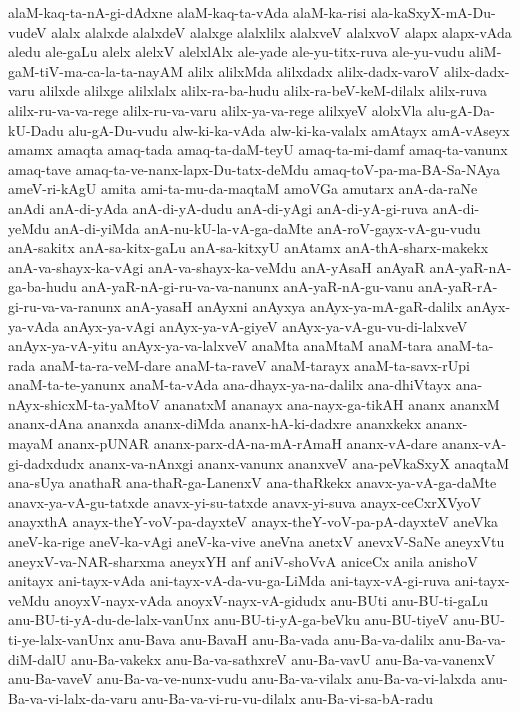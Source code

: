 {alaM-kaq-ta-nA-gi-dAdxne
alaM-kaq-ta-vAda
alaM-ka-risi
ala-kaSxyX-mA-Du-vudeV
alalx
alalxde
alalxdeV
alalxge
alalxlilx
alalxveV
alalxvoV
alapx
alapx-vAda
aledu
ale-gaLu
alelx
alelxV
alelxlAlx
ale-yade
ale-yu-titx-ruva
ale-yu-vudu
aliM-gaM-tiV-ma-ca-la-ta-nayAM
alilx
alilxMda
alilxdadx
alilx-dadx-varoV
alilx-dadx-varu
alilxde
alilxge
alilxlalx
alilx-ra-ba-hudu
alilx-ra-beV-keM-dilalx
alilx-ruva
alilx-ru-va-va-rege
alilx-ru-va-varu
alilx-ya-va-rege
alilxyeV
alolxVla
alu-gA-Da-kU-Dadu
alu-gA-Du-vudu
alw-ki-ka-vAda
alw-ki-ka-valalx
amAtayx
amA-vAseyx
amamx
amaqta
amaq-tada
amaq-ta-daM-teyU
amaq-ta-mi-damf
amaq-ta-vanunx
amaq-tave
amaq-ta-ve-nanx-lapx-Du-tatx-deMdu
amaq-toV-pa-ma-BA-Sa-NAya
ameV-ri-kAgU
amita
ami-ta-mu-da-maqtaM
amoVGa
amutarx
anA-da-raNe
anAdi
anA-di-yAda
anA-di-yA-dudu
anA-di-yAgi
anA-di-yA-gi-ruva
anA-di-yeMdu
anA-di-yiMda
anA-nu-kU-la-vA-ga-daMte
anA-roV-gayx-vA-gu-vudu
anA-sakitx
anA-sa-kitx-gaLu
anA-sa-kitxyU
anAtamx
anA-thA-sharx-makekx
anA-va-shayx-ka-vAgi
anA-va-shayx-ka-veMdu
anA-yAsaH
anAyaR
anA-yaR-nA-ga-ba-hudu
anA-yaR-nA-gi-ru-va-va-nanunx
anA-yaR-nA-gu-vanu
anA-yaR-rA-gi-ru-va-va-ranunx
anA-yasaH
anAyxni
anAyxya
anAyx-ya-mA-gaR-dalilx
anAyx-ya-vAda
anAyx-ya-vAgi
anAyx-ya-vA-giyeV
anAyx-ya-vA-gu-vu-di-lalxveV
anAyx-ya-vA-yitu
anAyx-ya-va-lalxveV
anaMta
anaMtaM
anaM-tara
anaM-ta-rada
anaM-ta-ra-veM-dare
anaM-ta-raveV
anaM-tarayx
anaM-ta-savx-rUpi
anaM-ta-te-yanunx
anaM-ta-vAda
ana-dhayx-ya-na-dalilx
ana-dhiVtayx
ana-nAyx-shicxM-ta-yaMtoV
ananatxM
ananayx
ana-nayx-ga-tikAH
ananx
ananxM
ananx-dAna
ananxda
ananx-diMda
ananx-hA-ki-dadxre
ananxkekx
ananx-mayaM
ananx-pUNAR
ananx-parx-dA-na-mA-rAmaH
ananx-vA-dare
ananx-vA-gi-dadxdudx
ananx-va-nAnxgi
ananx-vanunx
ananxveV
ana-peVkaSxyX
anaqtaM
ana-sUya
anathaR
ana-thaR-ga-LanenxV
ana-thaRkekx
anavx-ya-vA-ga-daMte
anavx-ya-vA-gu-tatxde
anavx-yi-su-tatxde
anavx-yi-suva
anayx-ceCxrXVyoV
anayxthA
anayx-theY-voV-pa-dayxteV
anayx-theY-voV-pa-pA-dayxteV
aneVka
aneV-ka-rige
aneV-ka-vAgi
aneV-ka-vive
aneVna
anetxV
anevxV-SaNe
aneyxVtu
aneyxV-va-NAR-sharxma
aneyxYH
anf
aniV-shoVvA
aniceCx
anila
anishoV
anitayx
ani-tayx-vAda
ani-tayx-vA-da-vu-ga-LiMda
ani-tayx-vA-gi-ruva
ani-tayx-veMdu
anoyxV-nayx-vAda
anoyxV-nayx-vA-gidudx
anu-BUti
anu-BU-ti-gaLu
anu-BU-ti-yA-du-de-lalx-vanUnx
anu-BU-ti-yA-ga-beVku
anu-BU-tiyeV
anu-BU-ti-ye-lalx-vanUnx
anu-Bava
anu-BavaH
anu-Ba-vada
anu-Ba-va-dalilx
anu-Ba-va-diM-dalU
anu-Ba-vakekx
anu-Ba-va-sathxreV
anu-Ba-vavU
anu-Ba-va-vanenxV
anu-Ba-vaveV
anu-Ba-va-ve-nunx-vudu
anu-Ba-va-vilalx
anu-Ba-va-vi-lalxda
anu-Ba-va-vi-lalx-da-varu
anu-Ba-va-vi-ru-vu-dilalx
anu-Ba-vi-sa-bA-radu
}
